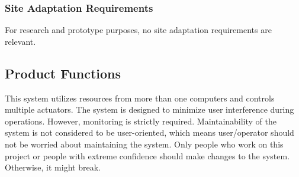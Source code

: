 \documentclass[compsoc,draftclsnofoot,onecolumn,10pt]{IEEEtran}
\begin{document}
\subsubsection{Site Adaptation Requirements}
For research and prototype purposes, no site adaptation requirements are relevant. 

\subsection{Product Functions} %
This system utilizes resources from more than one computers and controls multiple
actuators. The system is designed to minimize user interference during operations.
However, monitoring is strictly required. 
Maintainability of the system is not considered to be user-oriented, which means 
user/operator should not be worried about maintaining the system. Only people who 
work on this project or people with extreme confidence should make changes to the 
system. Otherwise, it might break. 
%
\end{document}
